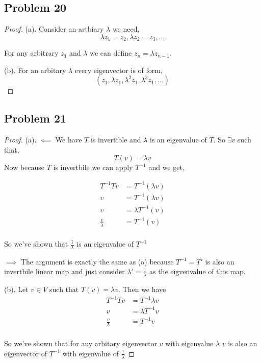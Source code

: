 \documentclass[a4paper]{report}
\begin{document}
\subsection*{Problem 20}
\begin{proof}
   
(a). Consider an artbiary $\lambda$ we need, 
$$ \lambda z_1 = z_2, \lambda z_2 = z_3,\dots $$ 

For any arbitrary $z_1$ and $\lambda $ we can define $z_n = \lambda z_{n-1}$. 

(b). For an arbitary $\lambda$ every eigenvector is of form, 
$$ (z_1,\lambda z_1, \lambda^2 z_1, \lambda^3 z_1,\dots) $$ 



\end{proof}
\subsection*{Problem 21}
\begin{proof}
   
(a). $\impliedby$ We have $T$ is invertible and $\lambda$ is an eigenvalue of $T$. So $\exists v$ such that, 
$$ T(v) = \lambda v $$ 
Now because $T$ is invertbile  we can apply $T^{-1}$ and we get, 

\begin{align*}
   T^{-1}Tv &= T^{-1}(\lambda v)\\
   v&= T^{-1}(\lambda v)\\
   v &= \lambda T^{-1}(v)\\
   \frac{v}{\lambda} &=  T^{-1}(v)\\
\end{align*}

So we've shown that $\frac{1}{\lambda}$ is an eigenvalue of $T^{-1}$


$\implies$
 The argument is exactly the same as (a) because $T^{-1} = T'$ is also an invertbile linear map and just consider $\lambda' = \frac{1}{\lambda}$ as the eigvenvalue of this map.


 (b). 
 Let $v \in V$ such that $T(v) = \lambda v$. Then we have  
 \begin{align*}
    T^{-1}T v &= T^{-1} \lambda v\\
    v &= \lambda T^{-1} v\\
    \frac{v}{\lambda} &= T^{-1} v\\
 \end{align*}

 So we've shown that for any arbitary eigenvector $v$ with eigenvalue $\lambda$ $v$ is also an eigenvector of $T^{-1}$ with eigenvalue of $\frac{1}{\lambda}$ 

\end{proof}
\end{document}
